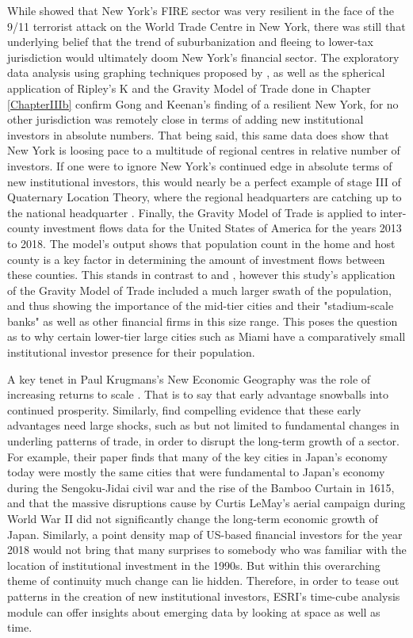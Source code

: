 While \cite{gongthe2012} showed that New York's FIRE sector was very resilient in the face of the 9/11 terrorist attack on the World Trade Centre in New York, there was still that underlying belief that the trend of suburbanization and fleeing to lower-tax jurisdiction would ultimately doom New York's financial sector.  The exploratory data analysis using graphing techniques proposed by  \cite{tufte1998visual}, as well as the spherical application of Ripley's K and the Gravity Model of Trade done in Chapter \ref{ChapterIIIb} confirm Gong and Keenan's finding of a resilient New York, for no other jurisdiction was remotely close in terms of adding new institutional investors in absolute numbers.  That being said, this same data does show that New York is loosing pace to a multitude of regional centres in relative number of investors.  If one were to ignore New York's continued edge in absolute terms of new institutional investors, this would nearly be a perfect example of stage III of Quaternary Location Theory, where the regional headquarters are catching up to the national headquarter \citep{Semple_Phipps82}.  Finally, the Gravity Model of Trade is applied to inter-county investment flows data for the United States of America for the years 2013 to 2018.  The model's output shows that population count in the home and host county is a key factor in determining the amount of investment flows between these counties.  This stands in contrast to \cite{greena1993} and \cite{GreenOLef2014}, however this study's application of the Gravity Model of Trade included a much larger swath of the population, and thus showing the importance of the mid-tier cities and their "stadium-scale banks" as well as other financial firms in this size range. This poses the question as to why certain lower-tier large cities such as Miami have a comparatively small institutional investor presence for their population.  

A key tenet in Paul Krugmans's New Economic Geography was the role of increasing returns to scale \citep{krugman1991increasing}.  That is to say that early advantage snowballs into continued prosperity.  Similarly, \cite{davis2002bones} find compelling evidence that these early advantages need large shocks, such as but not limited to fundamental changes in underling patterns of trade, in order to disrupt the long-term growth of a sector.  For example, their paper finds that many of the key cities in Japan's economy today were mostly the same cities that were fundamental to Japan's economy during the Sengoku-Jidai civil war and the rise of the Bamboo Curtain in 1615, and that the massive disruptions cause by Curtis LeMay's aerial campaign during World War II did not significantly change the long-term economic growth of Japan.  Similarly, a point density map of US-based financial investors for the year 2018 would not bring that many surprises to somebody who was familiar with the location of institutional investment in the 1990s.  But within this overarching theme of continuity much change can lie hidden.  Therefore, in order to tease out patterns in the creation of new institutional investors, ESRI's time-cube analysis module can offer insights about emerging data by looking at space as well as time. 

